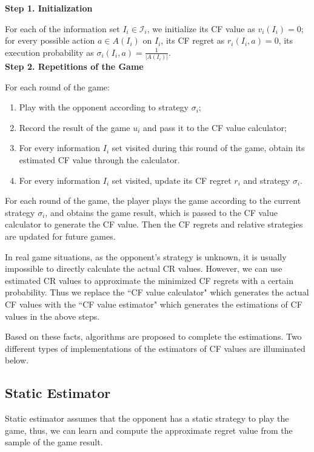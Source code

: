 \documentclass{article}
\begin{document}
\noindent\textbf{Step 1. Initialization}

For each of the information set $I_i \in \mathscr{I}_i$, we initialize its CF value as $v_i(I_i) = 0$; for every possible action $a \in A(I_i)$ on $I_i$, its CF regret as $r_i(I_i, a) = 0$, its execution probability as $\sigma_i(I_i, a) = \frac {1} {|A(I_i)|}$.\\
\noindent\textbf{Step 2. Repetitions of the Game}

For each round of the game:

\begin{enumerate}
\item Play with the opponent according to strategy $\sigma_i$;
\item Record the result of the game $u_i$ and pass it to the CF value calculator;
\item For every information $I_i$ set visited during this round of the game, obtain its estimated CF value through the calculator.
\item For every information $I_i$ set visited, update its CF regret $r_i$ and strategy $\sigma_i$.
\end{enumerate}

For each round of the game, the player plays the game according to the current strategy $\sigma_i$, and obtains the game result, which is passed to the CF value calculator to generate the CF value. Then the CF regrets and relative strategies are updated for future games.

In real game situations, as the opponent's strategy is unknown, it is usually impossible to directly calculate the actual CR values. However, we can use estimated CR values to approximate the minimized CF regrets with a certain probability. Thus we replace the ``CF value calculator" which  generates the actual CF values with the ``CF value estimator" which generates the estimations of CF values in the above steps.

Based on these facts, algorithms are proposed to complete the estimations. Two different types of implementations of the estimators of CF values are illuminated below.

\subsection{Static Estimator}

Static estimator assumes that the opponent has a static strategy to play the game, thus, we can learn and compute the approximate regret value from the sample of the game result.
\end{document}

